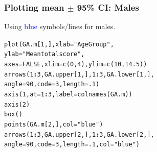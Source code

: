 \documentclass{beamer}\usepackage[]{graphicx}\usepackage[]{color}
\makeatletter
\newcommand{\hlnum}[1]{\textcolor[rgb]{0.533,0,0.133}{#1}}%
\newcommand{\hlstr}[1]{\textcolor[rgb]{0.667,0.267,0}{#1}}%
\newcommand{\hlopt}[1]{\textcolor[rgb]{0,0,0}{\textbf{#1}}}%
\newcommand{\hlstd}[1]{\textcolor[rgb]{0,0,0}{#1}}%
\newcommand{\hlkwc}[1]{\textcolor[rgb]{0,0,0.4}{#1}}%
\newcommand{\hlkwd}[1]{\textcolor[rgb]{0,0.267,0.4}{#1}}%
\newenvironment{kframe}{%
 \def\at@end@of@kframe{}%
 \ifinner\ifhmode%
  \def\at@end@of@kframe{\end{minipage}}%
  \begin{minipage}{\columnwidth}%
 \fi\fi%
 \def\FrameCommand##1{\hskip\@totalleftmargin \hskip-\fboxsep
 \colorbox{shadecolor}{##1}\hskip-\fboxsep
     \hskip-\linewidth \hskip-\@totalleftmargin \hskip\columnwidth}%
 \MakeFramed {\advance\hsize-\width
   \@totalleftmargin\z@ \linewidth\hsize
   \@setminipage}}%
 {\par\unskip\endMakeFramed%
 \at@end@of@kframe}
\newenvironment{knitrout}{}{} %
\makeatother
\begin{document}
\begin{frame}[fragile]
  \frametitle{Plotting mean $\pm$ 95\% CI: Males}
Using \textcolor{blue}{blue} symbols/lines for males.
\begin{knitrout}
\color{fgcolor}\begin{kframe}
\begin{alltt}
\hlkwd{plot}\hlstd{(GA.m[}\hlnum{1}\hlstd{, ],} \hlkwc{xlab} \hlstd{=} \hlstr{"Age Group"}\hlstd{,}
     \hlkwc{ylab} \hlstd{=} \hlstr{"Mean total score"}\hlstd{,}
     \hlkwc{axes} \hlstd{=} \hlnum{FALSE}\hlstd{,} \hlkwc{xlim} \hlstd{=} \hlkwd{c}\hlstd{(}\hlnum{0}\hlstd{,} \hlnum{4}\hlstd{),} \hlkwc{ylim} \hlstd{=} \hlkwd{c}\hlstd{(}\hlnum{10}\hlstd{,} \hlnum{14.5}\hlstd{))}
\hlkwd{arrows}\hlstd{(}\hlnum{1}\hlopt{:}\hlnum{3}\hlstd{, GA.upper[}\hlnum{1}\hlstd{, ],} \hlnum{1}\hlopt{:}\hlnum{3}\hlstd{, GA.lower[}\hlnum{1}\hlstd{, ],}
       \hlkwc{angle} \hlstd{=} \hlnum{90}\hlstd{,} \hlkwc{code} \hlstd{=} \hlnum{3}\hlstd{,} \hlkwc{length} \hlstd{=} \hlnum{.1}\hlstd{)}
\hlkwd{axis}\hlstd{(}\hlnum{1}\hlstd{,} \hlkwc{at} \hlstd{=} \hlnum{1}\hlopt{:}\hlnum{3}\hlstd{,} \hlkwc{label} \hlstd{=} \hlkwd{colnames}\hlstd{(GA.m))}
\hlkwd{axis}\hlstd{(}\hlnum{2}\hlstd{)}
\hlkwd{box}\hlstd{()}
\hlkwd{points}\hlstd{(GA.m[}\hlnum{2}\hlstd{, ],} \hlkwc{col} \hlstd{=} \hlstr{"blue"}\hlstd{)}
\hlkwd{arrows}\hlstd{(}\hlnum{1}\hlopt{:}\hlnum{3}\hlstd{, GA.upper[}\hlnum{2}\hlstd{, ],} \hlnum{1}\hlopt{:}\hlnum{3}\hlstd{, GA.lower[}\hlnum{2}\hlstd{, ],}
       \hlkwc{angle} \hlstd{=} \hlnum{90}\hlstd{,} \hlkwc{code} \hlstd{=} \hlnum{3}\hlstd{,} \hlkwc{length} \hlstd{=} \hlnum{.1}\hlstd{,} \hlkwc{col} \hlstd{=} \hlstr{"blue"}\hlstd{)}
\end{alltt}
\end{kframe}
\end{knitrout}
\end{frame} 
\end{document}
